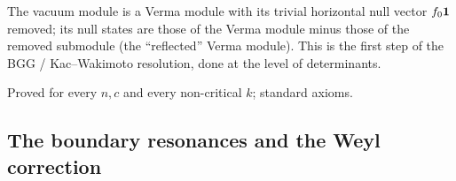 \begin{physics}
The vacuum module is a Verma module with its trivial horizontal null vector $f_0\mathbf{1}$ removed; its null states are
those of the Verma module minus those of the removed submodule (the ``reflected'' Verma module). This is the first step of
the BGG / Kac--Wakimoto resolution, done at the level of determinants.
\end{physics}

\begin{status}
Proved for every $n,c$ and every non-critical $k$; standard axioms.
\end{status}

\subsection{The boundary resonances and the Weyl correction}

